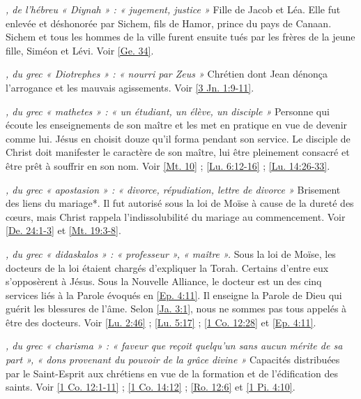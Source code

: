 \begin{multicols}{2}
\textit{, de l'hébreu « Diynah » : « jugement, justice »}\newline
Fille de Jacob et Léa. Elle fut enlevée et déshonorée par Sichem, fils de Hamor, prince du pays de Canaan. Sichem et tous les hommes de la ville furent ensuite tués par les frères de la jeune fille, Siméon et Lévi. Voir \vref{Ge. 34}.

\textit{, du grec « Diotrephes » : « nourri par Zeus »}\newline
Chrétien dont Jean dénonça l'arrogance et les mauvais agissements. Voir \vref{3 Jn. 1:9-11}.

\textit{, du grec « mathetes » : « un étudiant, un élève, un disciple »}\newline
Personne qui écoute les enseignements de son maître et les met en pratique en vue de devenir comme lui. Jésus en choisit douze qu'il forma pendant son service. Le disciple de Christ doit manifester le caractère de son maître, lui être pleinement consacré et être prêt à souffrir en son nom. Voir \vref{Mt. 10} ; \vref{Lu. 6:12-16} ; \vref{Lu. 14:26-33}.

\textit{, du grec « apostasion » : « divorce, répudiation, lettre de divorce »}\newline
Brisement des liens du mariage*. Il fut autorisé sous la loi de Moïse à cause de la dureté des cœurs, mais Christ rappela l'indissolubilité du mariage au commencement. Voir \vref{De. 24:1-3} et \vref{Mt. 19:3-8}.

\textit{, du grec « didaskalos » : « professeur », « maître ».}\newline
Sous la loi de Moïse, les docteurs de la loi étaient chargés d'expliquer la Torah. Certains d'entre eux s'opposèrent à Jésus. Sous la Nouvelle Alliance, le docteur est un des cinq services liés à la Parole évoqués en \vref{Ep. 4:11}. Il enseigne la Parole de Dieu qui guérit les blessures de l'âme. Selon \vref{Ja. 3:1}, nous ne sommes pas tous appelés à être des docteurs. Voir \vref{Lu. 2:46} ; \vref{Lu. 5:17} ; \vref{1 Co. 12:28} et \vref{Ep. 4:11}.

\textit{, du grec « charisma » : « faveur que reçoit quelqu'un sans aucun mérite de sa part », « dons provenant du pouvoir de la grâce divine »}\newline
Capacités distribuées par le Saint-Esprit aux chrétiens en vue de la formation et de l'édification des saints. Voir \vref{1 Co. 12:1-11} ; \vref{1 Co. 14:12} ; \vref{Ro. 12:6} et \vref{1 Pi. 4:10}.


\end{multicols}
